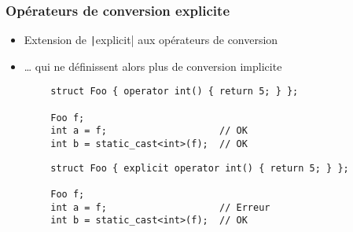 \documentclass[C++.tex]{subfiles}
\begin{document}
\begin{frame}[fragile]
	\frametitle{Opérateurs de conversion explicite}
	\begin{itemize}
		\item Extension de \texttt|explicit| aux opérateurs de conversion
		\item \ldots{} qui ne définissent alors plus de conversion implicite
	\end{itemize}

	\begin{verbatim}
		struct Foo { operator int() { return 5; } };

		Foo f;
		int a = f;                    // OK
		int b = static_cast<int>(f);  // OK
	\end{verbatim}

	\begin{verbatim}
		struct Foo { explicit operator int() { return 5; } };

		Foo f;
		int a = f;                    // Erreur
		int b = static_cast<int>(f);  // OK
	\end{verbatim}


\end{frame}
\end{document}
